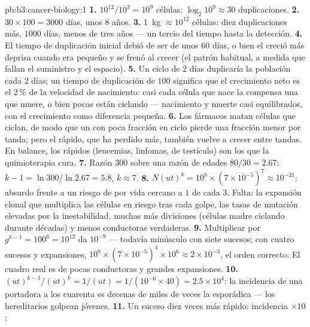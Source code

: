 \begin{solution}{pb:b3:cancer-biology:1}
\textbf{1.} $10^{12}/10^{3} = 10^{9}$ células; $\log_{2}10^{9} \approx 30$
duplicaciones.
\textbf{2.} $30\times 100 = 3000$ días, unos $8$ años.
\textbf{3.} \qty{1}{kg} $\approx 10^{12}$ células: diez duplicaciones
más, $1000$ días, menos de tres años --- un tercio del tiempo hasta la
detección.
\textbf{4.} El tiempo de duplicación inicial debió de ser de unos $60$
días, o bien el  creció más deprisa cuando era pequeño y se frenó al
crecer (el patrón habitual, a medida que fallan el suministro y el
espacio).
\textbf{5.} Un ciclo de $2$ días duplicaría la población cada $2$ días;
un tiempo de duplicación de $100$ significa que el crecimiento neto es el
$2\,\%$ de la velocidad de nacimiento: casi cada célula que nace la
compensa una que muere, o bien pocas están ciclando --- nacimiento y
muerte casi equilibrados, con el crecimiento como diferencia pequeña.
\textbf{6.} Los fármacos matan células que ciclan, de modo que un 
con poca fracción en ciclo pierde una fracción menor por tanda; pero el
 rápido, que ha perdido más, también vuelve a crecer entre tandas.
En balance, los  rápidos (leucemias, linfomas,  de
testículo) son los que la quimioterapia cura.
\textbf{7.} Razón $300$ sobre una razón de edades $80/30 = 2.67$: $k - 1 =
\ln 300/\ln 2.67 = 5.8$, $k \approx 7$.
\textbf{8.} $N(ut)^{k} = 10^{8}\times (7\times 10^{-5})^{7} \approx
10^{-21}$: absurdo frente a un riesgo de por vida cercano a $1$ de cada
$3$. Falta: la expansión clonal que multiplica las células en riesgo tras
cada golpe, las tasas de mutación elevadas por la inestabilidad, muchas
más divisiones (células madre ciclando durante décadas) y menos
conductoras verdaderas.
\textbf{9.} Multiplicar por $g^{k-1} = 100^{6} = 10^{12}$ da $10^{-9}$
--- todavía minúsculo con siete sucesos; con cuatro sucesos y
expansiones, $10^{8}\times (7\times 10^{-5})^{4}\times 10^{6} \approx 2\times
10^{-3}$, el orden correcto. El cuadro real es de pocas conductoras y
grandes expansiones.
\textbf{10.} $(ut)^{k-1}/(ut)^{k} = 1/(ut) = 1/(10^{-6}\times 40) =
2.5\times 10^{4}$: la incidencia de una portadora a los cuarenta es
decenas de miles de veces la esporádica --- los  hereditarios
golpean jóvenes.
\textbf{11.} Un suceso diez veces más rápido: incidencia $\times 10$;

\end{solution}
